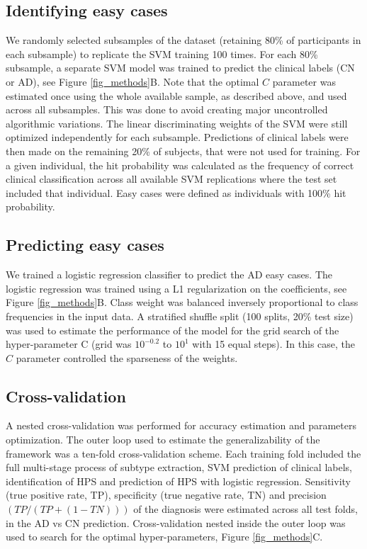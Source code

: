 \documentclass[authoryear]{elsarticle}
\begin{document}
\subsection*{Identifying easy cases}
We randomly selected subsamples of the dataset (retaining 80\% of participants in each subsample) to replicate the SVM training 100 times. For each 80\% subsample, a separate SVM model was trained to predict the clinical labels (CN or AD), see Figure \ref{fig_methods}B. Note that the optimal $C$ parameter was estimated once using the whole available sample, as described above, and used across all subsamples. This was done to avoid creating major uncontrolled algorithmic variations. The linear discriminating weights of the SVM were still optimized independently for each subsample. Predictions of clinical labels were then made on the remaining 20\% of subjects, that were not used for training. For a given individual, the hit probability was calculated as the frequency of correct clinical classification across all available SVM replications where the test set included that individual. Easy cases were defined as individuals with 100\% hit probability.
\subsection*{Predicting easy cases}
We trained a logistic regression classifier \cite{Fan2008} to predict the AD easy cases. The logistic regression was trained using a L1 regularization on the coefficients, see Figure \ref{fig_methods}B. Class weight was balanced inversely proportional to class frequencies in the input data. A stratified shuffle split (100 splits, 20\% test size) was used to estimate the performance of the model for the grid search of the hyper-parameter C (grid was $10^{-0.2}$ to $10^{1}$ with 15 equal steps). In this case, the $C$ parameter controlled the sparseness of the weights.

\subsection*{Cross-validation}

A nested cross-validation was performed for accuracy estimation and parameters optimization. The outer loop used to estimate the generalizability of the framework was a ten-fold cross-validation scheme. Each training fold included the full multi-stage process of subtype extraction, SVM prediction of clinical labels, identification of HPS and prediction of HPS with logistic regression. Sensitivity (true positive rate, TP), specificity (true negative rate, TN) and precision $(TP/(TP+(1-TN)))$ of the diagnosis were estimated across all test folds, in the AD vs CN prediction. Cross-validation nested inside the outer loop was used to search for the optimal hyper-parameters, Figure \ref{fig_methods}C. 
\end{document}
